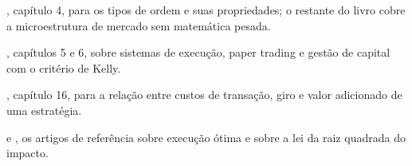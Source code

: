 \begin{leituras}
  \item \citet{harris2003}, capítulo 4, para os tipos de ordem e suas propriedades; o restante do livro cobre a microestrutura de mercado sem matemática pesada.
  \item \citet{chan2021}, capítulos 5 e 6, sobre sistemas de execução, paper trading e gestão de capital com o critério de Kelly.
  \item \citet{grinold2000}, capítulo 16, para a relação entre custos de transação, giro e valor adicionado de uma estratégia.
  \item \citet{almgren2001} e \citet{toth2011}, os artigos de referência sobre execução ótima e sobre a lei da raiz quadrada do impacto.
\end{leituras}
